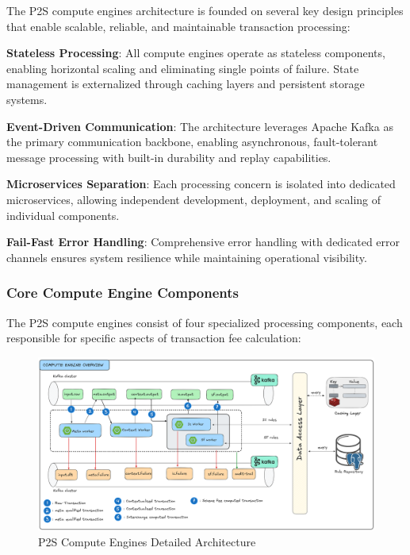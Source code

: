 The P2S compute engines architecture is founded on several key design principles that enable scalable, reliable, and maintainable transaction processing:

\textbf{Stateless Processing}: All compute engines operate as stateless components, enabling horizontal scaling and eliminating single points of failure. State management is externalized through caching layers and persistent storage systems.

\textbf{Event-Driven Communication}: The architecture leverages Apache Kafka as the primary communication backbone, enabling asynchronous, fault-tolerant message processing with built-in durability and replay capabilities.

\textbf{Microservices Separation}: Each processing concern is isolated into dedicated microservices, allowing independent development, deployment, and scaling of individual components.

\textbf{Fail-Fast Error Handling}: Comprehensive error handling with dedicated error channels ensures system resilience while maintaining operational visibility.

\subsubsection{Core Compute Engine Components}

The P2S compute engines consist of four specialized processing components, each responsible for specific aspects of transaction fee calculation:

\begin{figure}[H]
    \centering
    \includegraphics[width=1\textwidth]{img/arch/stateless-architecture.png}
    \caption{P2S Compute Engines Detailed Architecture}
    \label{fig:compute_engines_architecture}
\end{figure}

